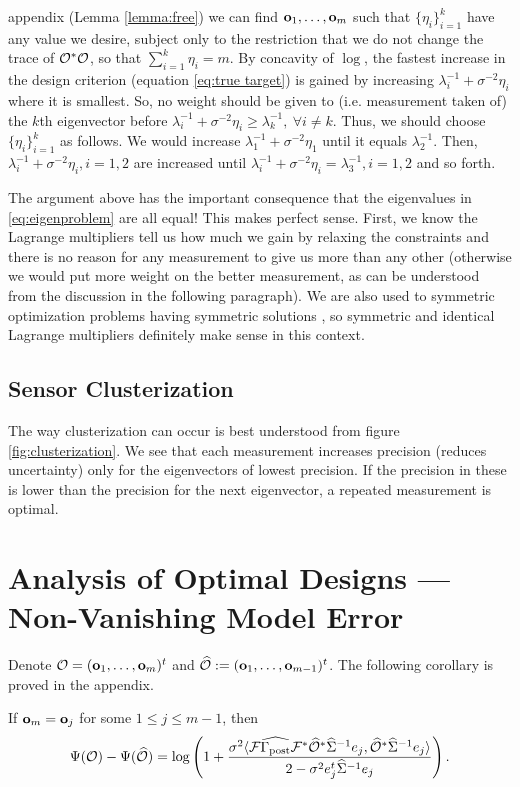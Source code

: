 \documentclass{amsart}
\numberwithin{equation}{section}
\begin{document}
appendix (Lemma \ref{lemma:free}) we can find $\mathbf{o}_1,\dots,\mathbf{o}_m$
such that $\{\eta_i\}_{i=1}^k$ have any value we desire, subject only
to the restriction that we do not change the trace of $\mathcal{O}^*\mathcal{O}$, so
that $\sum_{i=1}^k \eta_i = m$. By concavity of $\log$, the fastest
increase in the design criterion (equation \eqref{eq:true target}) is
gained by increasing $\lambda_i^{-1} + \sigma^{-2}\eta_i$ where it is
smallest. So, no weight should be given to (i.e. measurement taken of)
the $k$th eigenvector before $\lambda_i^{-1} + \sigma^{-2}\eta_i \geq
\lambda_k^{-1},\ \forall i \neq k$. Thus, we should choose
$\{\eta_i\}_{i=1}^k$ as follows. We would increase $\lambda_1^{-1} +
\sigma^{-2} \eta_1$ until it equals $\lambda_2^{-1}$. Then,
$\lambda_i^{-1} + \sigma^{-2} \eta_i,i=1,2$ are increased until
$\lambda_i^{-1} + \sigma^{-2} \eta_i = \lambda_3^{-1},i=1,2$ and so
forth.

The argument above has the important consequence that the eigenvalues
in \eqref{eq:eigenproblem} are all equal! This makes perfect
sense. First, we know the Lagrange multipliers tell us how much we
gain by relaxing the constraints and there is no reason for any
measurement to give us more than any other (otherwise we would put
more weight on the better measurement, as can be understood from the
discussion in the following paragraph). We are also used to symmetric
optimization problems having symmetric solutions \cite{Waterhouse83},
so symmetric and identical Lagrange multipliers definitely make sense
in this context.

\subsection{Sensor Clusterization}\label{subsec:clusterization}
The way clusterization can occur is best understood from figure
\ref{fig:clusterization}. We see that each measurement increases
precision (reduces uncertainty) only for the eigenvectors of lowest
precision. If the precision in these is lower than the precision for
the next eigenvector, a repeated measurement is optimal.


\section{Analysis of Optimal Designs --- Non-Vanishing Model Error}
Denote $\mathcal{O} = (\mathbf{o}_1,\dots,\mathbf{o}_m)^t$ and $\widehat{\mathcal{O}} :=
(\mathbf{o}_1,\dots,\mathbf{o}_{m-1})^t$. The following corollary is proved in
the appendix.
\begin{corollary}
  If $\mathbf{o}_m = \mathbf{o}_j$ for some $1 \leq j \leq m-1$, then
  \begin{equation*}
    \Psi(\mathcal{O}) - \Psi(\widehat{\mathcal{O}}) =
    \log \left ( 1 + \frac{\sigma^2
      \langle \mathcal{F} \widehat{\Gamma_{\textup{post}}} \mathcal{F}^* \widehat{\mathcal{O}}^* \widehat{\Sigma}^{-1} e_j,
      \widehat{\mathcal{O}}^* \widehat{\Sigma}^{-1}e_j \rangle
    }{
      2 - \sigma^2 e_j^t\widehat{\Sigma}^{-1}e_j 
    }       
    \right ).
  \end{equation*}
\end{corollary}
\end{document}
